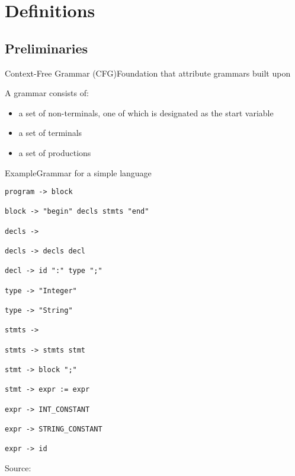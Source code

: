 
\section{Definitions}

\subsection*{Preliminaries}

\begin{frame}{Context-Free Grammar (CFG)}{Foundation that attribute grammars built upon}

A grammar consists of:
\begin{itemize}
    \item a set of non-terminals, one of which is designated as the start variable
    \item a set of terminals
    \item a set of productions
\end{itemize}
\end{frame}

\begin{frame}[fragile=singleslide]{Example}{Grammar for a simple language}

\begin{multicols}{2}
\begin{Verbatim}[fontsize=\scriptsize]
program -> block

block -> "begin" decls stmts "end"

decls ->

decls -> decls decl

decl -> id ":" type ";"

type -> "Integer"

type -> "String"

stmts -> 

stmts -> stmts stmt

stmt -> block ";"

stmt -> expr := expr

expr -> INT_CONSTANT

expr -> STRING_CONSTANT

expr -> id
\end{Verbatim}
\end{multicols}


Source: \cite{Boyland1998AnalyzingDN}

\end{frame}



